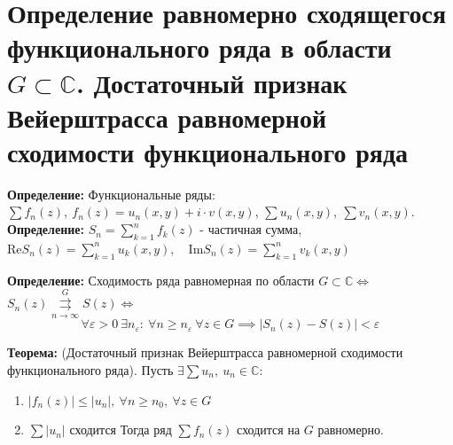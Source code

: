 \section{\texorpdfstring{Определение равномерно сходящегося
функционального ряда в области \(G \subset \mathbb{C}\). Достаточный
признак Вейерштрасса равномерной сходимости функционального
ряда}{Определение равномерно сходящегося функционального ряда в области G \textbackslash subset \textbackslash mathbb\{C\}. Достаточный признак Вейерштрасса равномерной сходимости функционального ряда}}\label{ux43eux43fux440ux435ux434ux435ux43bux435ux43dux438ux435-ux440ux430ux432ux43dux43eux43cux435ux440ux43dux43e-ux441ux445ux43eux434ux44fux449ux435ux433ux43eux441ux44f-ux444ux443ux43dux43aux446ux438ux43eux43dux430ux43bux44cux43dux43eux433ux43e-ux440ux44fux434ux430-ux432-ux43eux431ux43bux430ux441ux442ux438-g-subset-mathbbc.-ux434ux43eux441ux442ux430ux442ux43eux447ux43dux44bux439-ux43fux440ux438ux437ux43dux430ux43a-ux432ux435ux439ux435ux440ux448ux442ux440ux430ux441ux441ux430-ux440ux430ux432ux43dux43eux43cux435ux440ux43dux43eux439-ux441ux445ux43eux434ux438ux43cux43eux441ux442ux438-ux444ux443ux43dux43aux446ux438ux43eux43dux430ux43bux44cux43dux43eux433ux43e-ux440ux44fux434ux430}

\textbf{Определение:} Функциональные ряды:
\(\sum f_{n}(z), \ f_{n}(z)=u_{n}(x,y)+i\cdot v(x,y)\),
\(\sum u_{n}(x,y), \ \sum v_{n}(x,y)\). \textbf{Определение:}
\(S_{n}=\sum\limits_{k=1}^{n}f_{k}(z)\) - частичная сумма,
\(\mathrm{Re} S_{n}(z)=\sum\limits_{k=1}^{n}u_{k}(x,y), \quad \mathrm{Im} S_{n}(z)=\sum\limits_{k=1}^{n}v_{k}(x,y)\)

\textbf{Определение:} Сходимость ряда равномерная по области
\(G\subset \mathbb{C}\Leftrightarrow\)
\(S_{n}(z)\overset{G}{\underset{n\to \infty}{\rightrightarrows}}S(z)\Leftrightarrow\)
\[
\forall\varepsilon>0 \ \exists n_{\varepsilon}: \ \forall n\geq n_{\varepsilon} \ \forall z\in G \implies |S_{n}(z)-S(z)|<\varepsilon
\]

\textbf{Теорема:} (Достаточный признак Вейерштрасса равномерной
сходимости функционального ряда). Пусть
\(\exists \sum u_{n}, \ u_{n}\in \mathbb{C}\):

\begin{enumerate}
\def\labelenumi{\arabic{enumi}.}
\tightlist
\item
  \(|f_{n}(z)|\leq |u_{n}|, \ \forall n\geq n_{0}, \ \forall z\in G\)\\
\item
  \(\sum |u_{n}|\) сходится Тогда ряд \(\sum f_{n}(z)\) сходится на
  \(G\) равномерно.
\end{enumerate}
